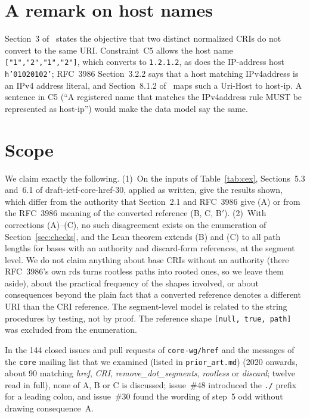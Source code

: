 \documentclass[11pt,a4paper]{article}
\theoremstyle{remark}
\newcommand{\lean}[1]{\texttt{#1}}
\newcommand{\cri}[1]{\texttt{#1}}
\newcommand{\uri}[1]{\texttt{#1}}
\newcommand{\rds}{\mathrm{rds}}
\begin{document}
\section{A remark on host names}
\label{sec:ipv4}
Section~3 of~\cite{href} states the objective that two distinct normalized CRIs do not convert to the
same URI. Constraint~C5 allows the host name \cri{["1","2","1","2"]}, which converts to \uri{1.2.1.2},
as does the IP-address host \cri{h'01020102'}; RFC~3986 Section~3.2.2 says that a host matching
IPv4address is an IPv4 address literal, and Section~8.1.2 of~\cite{href} maps such a Uri-Host to
host-ip. A sentence in C5 (``A registered name that matches the IPv4address rule MUST be represented as
host-ip'') would make the data model say the same.

\section{Scope}
\label{sec:scope}
We claim exactly the following. (1)~On the inputs of Table~\ref{tab:cex}, Sections~5.3 and~6.1 of
draft-ietf-core-href-30, applied as written, give the results shown, which differ from the authority that
Section~2.1 and RFC~3986 give (A) or from the RFC~3986 meaning of the converted reference (B, C, B$'$).
(2)~With corrections (A)--(C), no such disagreement exists on the enumeration of
Section~\ref{sec:checks}, and the Lean theorem extends (B) and (C) to all path lengths for bases with an
authority and discard-form references, at the segment level.
We do not claim anything about base CRIs without an authority (there RFC~3986's own $\rds$ turns
rootless paths into rooted ones, so we leave them aside), about the
practical frequency of the shapes involved, or about consequences beyond the plain fact that a
converted reference denotes a different URI than the CRI reference. The segment-level model is related
to the string procedures by testing, not by proof. The reference shape \cri{[null, true, path]} was
excluded from the enumeration.

In the 144 closed issues and pull requests of \lean{core-wg/href} and the messages of the \lean{core}
mailing list that we examined (listed in \lean{prior\_art.md}) (2020 onwards, about 90 matching \emph{href}, \emph{CRI},
\emph{remove\_dot\_segments}, \emph{rootless} or \emph{discard}; twelve read in full), none of A, B or C
is discussed; issue~\#48 introduced the \uri{./} prefix for a leading colon, and issue~\#30 found the
wording of step~5 odd without drawing consequence~A.
\end{document}
